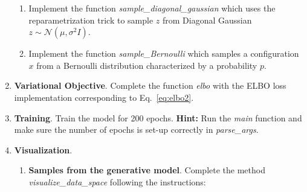 \begin{Q}
\begin{enumerate}
\begin{enumerate}
\item  Implement the function \textit{sample\_diagonal\_gaussian} which uses the reparametrization trick to sample $z$ from Diagonal Gaussian $z \sim \mathcal{N}(\mu,\sigma^2 I)$.
\item  Implement the function \textit{sample\_Bernoulli} which samples a configuration $x$ from a Bernoulli distribution characterized by a probability $p$.
\end{enumerate}

\item  \textbf{Variational Objective}. Complete the function \textit{elbo} with the ELBO loss implementation corresponding to Eq.~\ref{eq:elbo2}. 


\item  \textbf{Training}. Train the model for 200 epochs. \textbf{Hint: } Run the \textit{main} function and make sure the number of epochs is set-up correctly in \textit{parse\_args}.

\item \textbf{Visualization}.  
\begin{enumerate}
\item \textbf{Samples from the generative model}. Complete the method \textit{visualize\_data\_space} following the instructions:


\end{enumerate}
\end{enumerate}
\end{Q}
